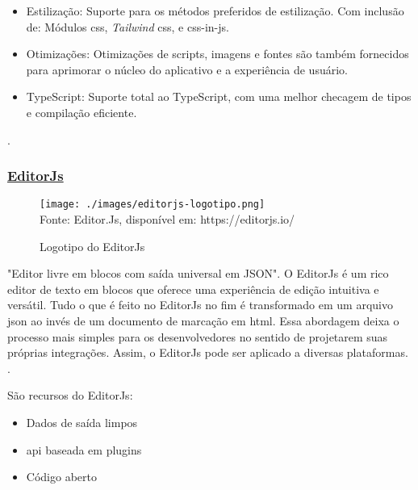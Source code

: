 \begin{itemize}
	\item Estilização: Suporte para os métodos preferidos de estilização. Com inclusão
                    de: Módulos \acrshort{css}, \textit{Tailwind} \acrshort{css},
                    e \acrshort{css}-in-\acrshort{js}.
                
	\item Otimizações: Otimizações de scripts, imagens e fontes são também fornecidos para aprimorar
                    o núcleo do aplicativo e a experiência de usuário.
                
	\item TypeScript: Suporte total ao TypeScript, com uma melhor checagem de tipos e compilação eficiente.
                
    
\end{itemize}

\cite{nexjs-docs}.
            

\subsubsection{\underline{EditorJs}}

\begin{figure}[H]
    \centering
    \caption{Logotipo do EditorJs}
    \texttt{[image: ./images/editorjs-logotipo.png]}
    \label{fig:editorjs-logotipo} \\
    \textnormal{\fontsize{10pt}{12pt}Fonte: Editor.Js, disponível em: https://editorjs.io/}
\end{figure}

"Editor livre em blocos com saída universal em JSON".
O EditorJs é um rico editor de texto em blocos que oferece uma experiência de
edição intuitiva e versátil. Tudo o que é feito no EditorJs no fim é transformado
em um arquivo \acrshort{json} ao invés de um documento de marcação
em \acrshort{html}.
Essa abordagem deixa o processo mais simples para os desenvolvedores no
sentido de projetarem suas próprias integrações. Assim, o EditorJs pode ser
aplicado a diversas plataformas.
\cite{editorjs}.

São recursos do EditorJs:

\begin{itemize}
        
	\item Dados de saída limpos
	\item \acrshort{api} baseada em plugins
	\item Código aberto
    
\end{itemize}

